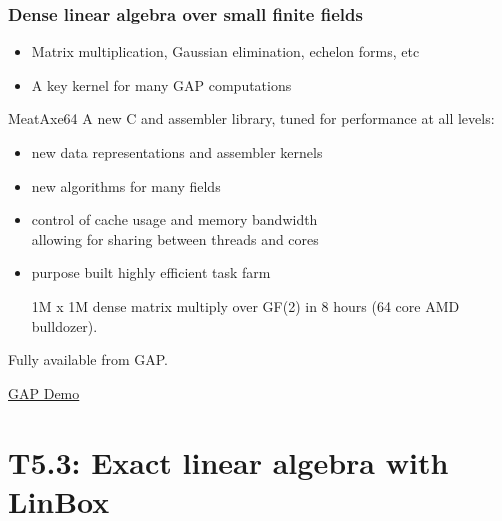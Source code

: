 \documentclass{beamer}
\newcommand{\thus}{\textcolor{red}{\MVRightarrow{}}\xspace}
\begin{document}
\begin{frame}
  \frametitle{Dense linear algebra over small finite fields}

  \begin{itemize}
  \item Matrix multiplication, Gaussian elimination, echelon forms, etc
  \item A key kernel for many GAP computations
  \end{itemize}

  \begin{block}{MeatAxe64}
  A new C and assembler library, tuned for performance at all levels:

  \begin{itemize}
  \item new data representations and assembler kernels
  \item new algorithms for many fields
  \item control of cache usage and memory bandwidth\\
    \thus allowing for sharing between threads and cores
  \item  purpose built highly efficient task farm

    \thus 1M x 1M dense matrix multiply over GF(2) in 8 hours (64 core AMD bulldozer).

  \end{itemize}
    Fully available from GAP.
  \end{block}
  \begin{center}
    \href{https://review-vre.opendreamkit.org/user/clementpernet/lab/tree/gap-demos/notebooks-master/Meataxe64\%20Demo.ipynb}{\alert{GAP   Demo}}
  \end{center}

\end{frame}
\section{T5.3: Exact linear algebra with LinBox}



\end{document}
